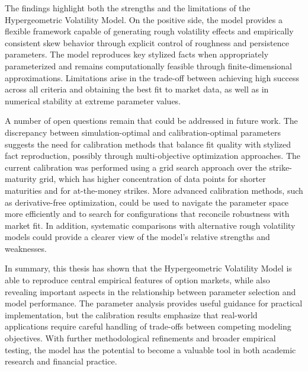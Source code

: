 The findings highlight both the strengths and the limitations of the Hypergeometric Volatility Model. On the positive side, the model provides a flexible framework capable of generating rough volatility effects and empirically consistent skew behavior through explicit control of roughness and persistence parameters. The model reproduces key stylized facts when appropriately parameterized and remains computationally feasible through finite-dimensional approximations. Limitations arise in the trade-off between achieving high success across all criteria and obtaining the best fit to market data, as well as in numerical stability at extreme parameter values.

A number of open questions remain that could be addressed in future work. The discrepancy between simulation-optimal and calibration-optimal parameters suggests the need for calibration methods that balance fit quality with stylized fact reproduction, possibly through multi-objective optimization approaches. The current calibration was performed using a grid search approach over the strike-maturity grid, which has higher concentration of data points for shorter maturities and for at-the-money strikes. More advanced calibration methods, such as derivative-free optimization, could be used to navigate the parameter space more efficiently and to search for configurations that reconcile robustness with market fit. In addition, systematic comparisons with alternative rough volatility models could provide a clearer view of the model's relative strengths and weaknesses.

In summary, this thesis has shown that the Hypergeometric Volatility Model is able to reproduce central empirical features of option markets, while also revealing important aspects in the relationship between parameter selection and model performance. The parameter analysis provides useful guidance for practical implementation, but the calibration results emphasize that real-world applications require careful handling of trade-offs between competing modeling objectives. With further methodological refinements and broader empirical testing, the model has the potential to become a valuable tool in both academic research and financial practice.